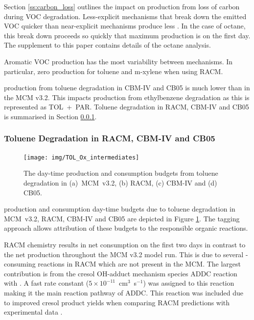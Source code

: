 Section \ref{ss:carbon_loss} outlines the impact on  production from loss of carbon during VOC degradation.
Less-explicit mechanisms that break down the emitted VOC quicker than near-explicit mechanisms produce less .
In the case of octane, this break down proceeds so quickly that maximum  production is on the first day. 
The supplement to this paper contains details of the octane analysis.

Aromatic VOC  production has the most variability between mechanisms. 
In particular, zero  production for toluene and m-xylene when using RACM.

 production from toluene degradation in CBM-IV and CB05 is much lower than in the MCM v3.2.
This impacts  production from ethylbenzene degradation as this is represented as \mbox{TOL + PAR}. 
Toluene degradation in RACM, CBM-IV and CB05 is summarised in Section \ref{sss:aromatic}.  

\subsubsection{Toluene Degradation in RACM, CBM-IV and CB05} \label{sss:aromatic}

\begin{figure}
    \centering
    \texttt{[image: img/TOL\_Ox\_intermediates]}
    \vspace{0mm}
    \caption{The day-time  production and consumption budgets from toluene degradation in \mbox{(a) MCM v3.2}, (b) RACM, (c) CBM-IV and (d) CB05.}
    \vspace{-4mm}
    \label{f:toluene_Ox}
\end{figure}

 production and consumption day-time budgets due to toluene degradation in \mbox{MCM v3.2}, RACM, CBM-IV and CB05 are depicted in Figure \ref{f:toluene_Ox}. 
The tagging approach allows attribution of these budgets to the responsible organic reactions.

RACM chemistry results in net  consumption on the first two days in contrast to the net  production throughout the MCM v3.2 model run.
This is due to several -consuming reactions in RACM which are not present in the MCM.
The largest contribution is from the cresol OH-adduct mechanism species ADDC reaction with . 
A fast rate constant \mbox{($5 \times 10^{-11}$ cm$^3$ s$^{-1}$)} was assigned to this reaction making it the main reaction pathway of ADDC. 
This reaction was included due to improved cresol product yields when comparing RACM predictions with experimental data \citep{Stockwell:1997}.

